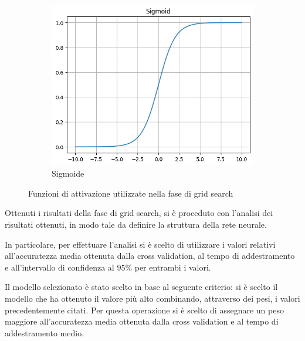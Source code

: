 \begin{figure}[!ht]
    \hfill
    \begin{subfigure}[b]{0.3\textwidth}
        \centering
        \includegraphics[width=\textwidth]{img/rete/sigmoid.png}
        \caption{Sigmoide}
        \label{fig:sigmoid}
    \end{subfigure}
       \caption{Funzioni di attivazione utilizzate nella fase di grid search}
       \label{fig:}
\end{figure}

Ottenuti i risultati della fase di grid search, si è proceduto con l'analisi dei
risultati ottenuti, in modo tale da definire la struttura della rete neurale.

In particolare, per effettuare l'analisi si è scelto di utilizzare i valori relativi
all'accuratezza media ottenuta dalla cross validation, al tempo di addestramento
e all'intervallo di confidenza al $95\%$ per entrambi i valori.

Il modello selezionato è stato scelto in base al seguente criterio: si è scelto
il modello che ha ottenuto il valore più alto combinando, attraverso dei pesi, 
i valori precedentemente citati. Per questa operazione si è scelto di assegnare 
un peso maggiore all'accuratezza media ottenuta dalla cross validation e al tempo
di addestramento medio. 

